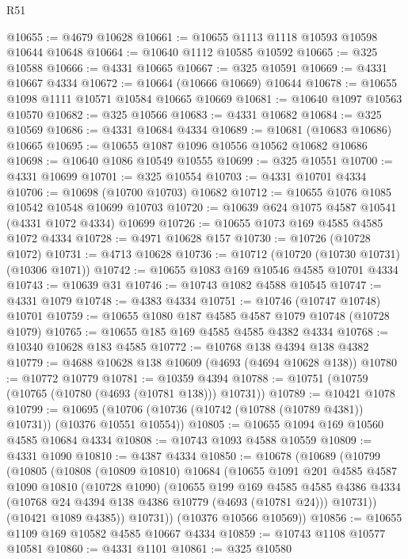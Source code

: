 \begin{lexlean}{R51}
\begin{coremodule}
@10655 := @4679 @10628
@10661 := @10655 @1113 @1118 @10593 @10598 @10644 @10648
@10664 := @10640 @1112 @10585 @10592
@10665 := @325 @10588
@10666 := @4331 @10665
@10667 := @325 @10591
@10669 := @4331 @10667 @4334
@10672 := @10664 (@10666 @10669) @10644
@10678 := @10655 @1098 @1111 @10571 @10584 @10665 @10669
@10681 := @10640 @1097 @10563 @10570
@10682 := @325 @10566
@10683 := @4331 @10682
@10684 := @325 @10569
@10686 := @4331 @10684 @4334
@10689 := @10681 (@10683 @10686) @10665
@10695 := @10655 @1087 @1096 @10556 @10562 @10682 @10686
@10698 := @10640 @1086 @10549 @10555
@10699 := @325 @10551
@10700 := @4331 @10699
@10701 := @325 @10554
@10703 := @4331 @10701 @4334
@10706 := @10698 (@10700 @10703) @10682
@10712 := @10655 @1076 @1085 @10542 @10548 @10699 @10703
@10720 := @10639 @624 @1075 @4587 @10541 (@4331 @1072 @4334) @10699
@10726 := @10655 @1073 @169 @4585 @4585 @1072 @4334
@10728 := @4971 @10628 @157
@10730 := @10726 (@10728 @1072)
@10731 := @4713 @10628
@10736 := @10712 (@10720 (@10730 @10731) (@10306 @1071))
@10742 := @10655 @1083 @169 @10546 @4585 @10701 @4334
@10743 := @10639 @31
@10746 := @10743 @1082 @4588 @10545
@10747 := @4331 @1079
@10748 := @4383 @4334
@10751 := @10746 (@10747 @10748) @10701
@10759 := @10655 @1080 @187 @4585 @4587 @1079 @10748 (@10728 @1079)
@10765 := @10655 @185 @169 @4585 @4585 @4382 @4334
@10768 := @10340 @10628 @183 @4585
@10772 := @10768 @138 @4394 @138 @4382
@10779 := @4688 @10628 @138 @10609 (@4693 (@4694 @10628 @138))
@10780 := @10772 @10779
@10781 := @10359 @4394
@10788 := @10751 (@10759 (@10765 (@10780 (@4693 (@10781 @138))) @10731))
@10789 := @10421 @1078
@10799 := @10695 (@10706 (@10736 (@10742 (@10788 (@10789 @4381)) @10731)) (@10376 @10551 @10554))
@10805 := @10655 @1094 @169 @10560 @4585 @10684 @4334
@10808 := @10743 @1093 @4588 @10559
@10809 := @4331 @1090
@10810 := @4387 @4334
@10850 := @10678
    (@10689
      (@10799
        (@10805
          (@10808
            (@10809 @10810)
            @10684
            (@10655
              @1091
              @201
              @4585
              @4587
              @1090
              @10810
              (@10728 @1090)
              (@10655
                @199
                @169
                @4585
                @4585
                @4386
                @4334
                (@10768 @24 @4394 @138 @4386 @10779 (@4693 (@10781 @24)))
                @10731))
            (@10421 @1089 @4385))
          @10731))
      (@10376 @10566 @10569))
@10856 := @10655 @1109 @169 @10582 @4585 @10667 @4334
@10859 := @10743 @1108 @10577 @10581
@10860 := @4331 @1101
@10861 := @325 @10580

\end{coremodule}
\end{lexlean}
